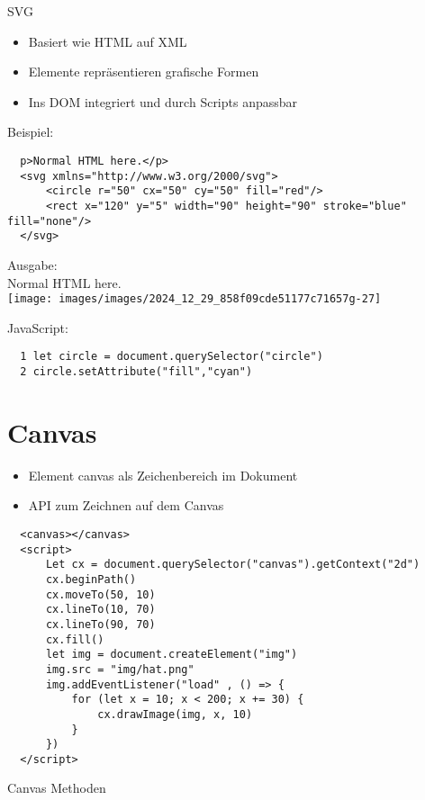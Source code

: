   SVG
  
  \begin{itemize}
    \item Basiert wie HTML auf XML
    \item Elemente repräsentieren grafische Formen
    \item Ins DOM integriert und durch Scripts anpassbar
  \end{itemize}
  
  Beispiel:
  
  \begin{verbatim}
  p>Normal HTML here.</p>
  <svg xmlns="http://www.w3.org/2000/svg">
      <circle r="50" cx="50" cy="50" fill="red"/>
      <rect x="120" y="5" width="90" height="90" stroke="blue" fill="none"/>
  </svg>
  \end{verbatim}
  
  Ausgabe:\\
  Normal HTML here.\\
  \texttt{[image: images/images/2024\_12\_29\_858f09cde51177c71657g-27]}
  
  JavaScript:
  
  \begin{verbatim}
  1 let circle = document.querySelector("circle")
  2 circle.setAttribute("fill","cyan")
  \end{verbatim}
  
  \section*{Canvas}
  \begin{itemize}
    \item Element canvas als Zeichenbereich im Dokument
    \item API zum Zeichnen auf dem Canvas
  \end{itemize}
  
  \begin{verbatim}
  <canvas></canvas>
  <script>
      Let cx = document.querySelector("canvas").getContext("2d")
      cx.beginPath()
      cx.moveTo(50, 10)
      cx.lineTo(10, 70)
      cx.lineTo(90, 70)
      cx.fill()
      let img = document.createElement("img")
      img.src = "img/hat.png"
      img.addEventListener("load" , () => {
          for (let x = 10; x < 200; x += 30) {
              cx.drawImage(img, x, 10)
          }
      })
  </script>
  \end{verbatim}
  
  Canvas Methoden
  
